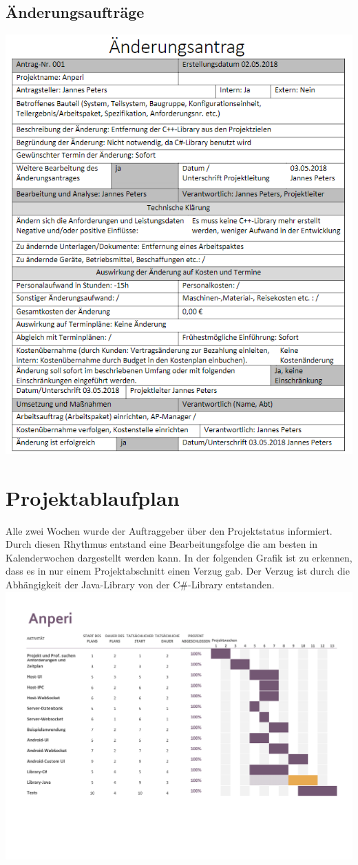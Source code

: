 \documentclass{scrartcl}
\begin{document}
\subsection{Änderungsaufträge}
\includegraphics[scale=1]{aenderungsantrag.png}
\section{Projektablaufplan}
Alle zwei Wochen wurde der Auftraggeber über den Projektstatus informiert.
Durch diesen Rhythmus entstand eine Bearbeitungsfolge die am besten in Kalenderwochen dargestellt werden kann.
In der folgenden Grafik ist zu erkennen, dass es in nur einem Projektabschnitt einen Verzug gab. Der Verzug ist durch die Abhängigkeit der Java-Library von der C\#-Library entstanden.
\includegraphics[scale=0.65]{Projektablaufplan.pdf}
\end{document}
